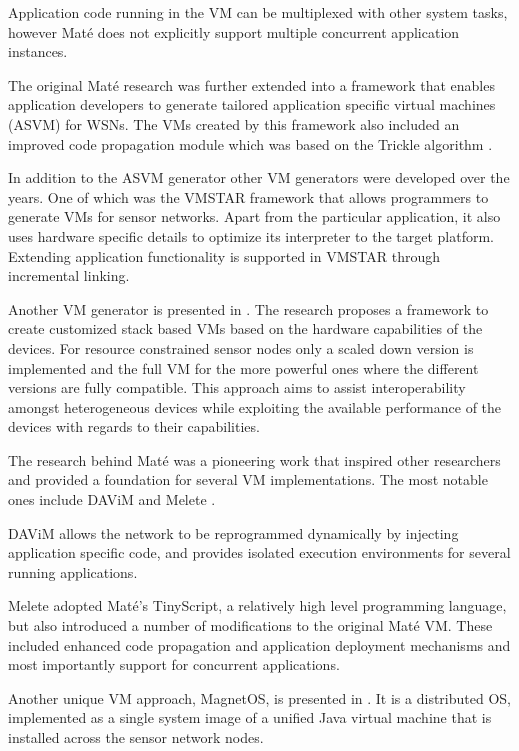 Application code running in the VM can be multiplexed with other system tasks, however Maté does not explicitly support multiple concurrent application instances.

The original Maté research was further extended into a framework that enables application developers to generate tailored application specific virtual machines (ASVM) \cite{levis2004bridging} for WSNs. The VMs created by this framework also included an improved code propagation module which was based on the Trickle algorithm \cite{Levis:2004:TSA:1251175.1251177}. 

In addition to the ASVM generator other VM generators were developed over the years. One of which was the VMSTAR framework \cite{koshy2005vmstar} that allows programmers to generate VMs for sensor networks. Apart from the particular application, it also uses hardware specific details to optimize its interpreter to the target platform. Extending application functionality is supported in VMSTAR through incremental linking.

Another VM generator is presented in \cite{Palmer:2004:VMG:1267242.1267243}. The research proposes a framework to create customized stack based VMs based on the hardware capabilities of the devices. For resource constrained sensor nodes only a scaled down version is implemented and the full VM for the more powerful ones where the different versions are fully compatible. This approach aims to assist interoperability amongst heterogeneous devices while exploiting the available performance of the devices with regards to their capabilities.  

The research behind Maté was a pioneering work that inspired other researchers and provided a foundation for several VM implementations. The most notable ones include DAViM \cite{Michiels:2006:DDA:1176866.1176868}  and Melete \cite{Yu:2006:SCA:1182807.1182822}.
 
DAViM allows the network to be reprogrammed dynamically by injecting application specific code, and provides isolated execution environments for several running applications.  

Melete adopted Maté's TinyScript, a relatively high level programming language, but also introduced a number of modifications to the original Maté VM. These included enhanced code propagation and application deployment mechanisms and most importantly support for concurrent applications.

Another unique VM approach, MagnetOS, is presented in \cite{Barr:2002:NSS:509526.509528}. It is a distributed OS, implemented as a single system image of a unified Java virtual machine that is installed across the sensor network nodes.

